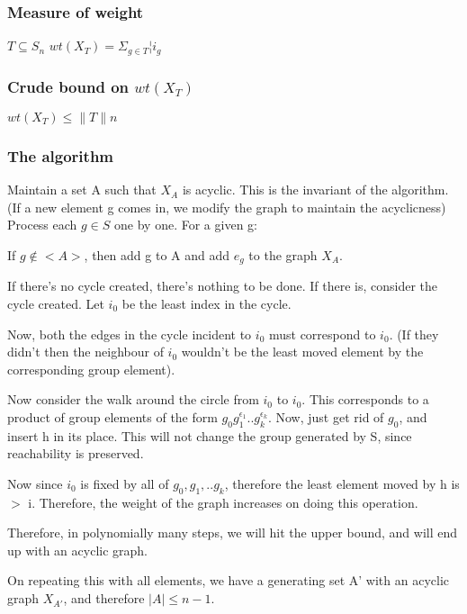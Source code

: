 \subsubsection{Measure of weight}
$T \subseteq S_n$
$wt(X_T )=\Sigma _{g \in T}¦i_g$

\subsubsection{Crude bound on $wt(X_T )$}
$wt(X_T )\leq \|T\|n$

\subsubsection{The algorithm}
Maintain a set A such that $X_A$  is acyclic. This is the invariant of the algorithm. (If a new element g comes in, we modify the graph to maintain the acyclicness)\newline
Process each $g \in S$ one by one.\newline\newline
For a given g:

	If $g \notin  <A>$, then add g to A and add $e_g$  to the graph $X_A$.

	If there's no cycle created, there's nothing to be done. If there is, consider the cycle created. Let $i_0$  be the least index in the cycle.

	Now, both the edges in the cycle incident to $i_0$ must correspond to $i_0$. (If they didn't then the neighbour of $i_0$ wouldn't be the least moved element by the corresponding group element).
	
	Now consider the walk around the circle from $i_0$ to $i_0$. This corresponds to a product of group elements of the form $g_0 g_1^{\epsilon_1} . . g_k^{\epsilon_k}$. Now, just get rid of $g_0$, and insert h in its place. This will not change the group generated by S, since reachability is preserved.
	
	Now since $i_0$ is fixed by all of $g_0, g_1, . . g_k$, therefore the least element moved by h is $>$ i. Therefore, the weight of the graph increases on doing this operation.
	
	Therefore, in polynomially many steps, we will hit the upper bound, and will end up with an acyclic graph.
	
	On repeating this with all elements, we have a generating set A' with an acyclic graph $X_{A'}$, and therefore $|A|\leq n-1$.






